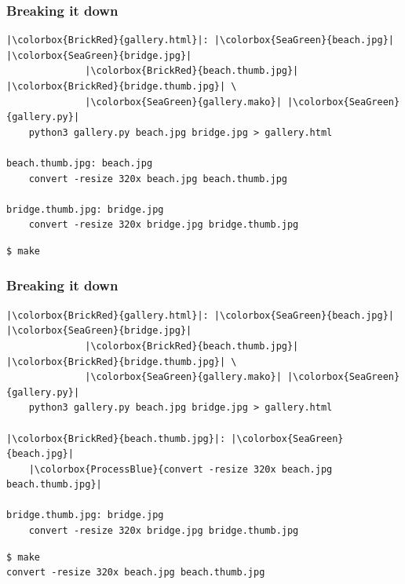 \documentclass[xcolor=dvipsnames,t,compress]{beamer}
\begin{document}
\begin{frame}[fragile]
\frametitle{Breaking it down}
\vspace{-1em}
\begin{verbatim}
|\colorbox{BrickRed}{gallery.html}|: |\colorbox{SeaGreen}{beach.jpg}| |\colorbox{SeaGreen}{bridge.jpg}|
              |\colorbox{BrickRed}{beach.thumb.jpg}| |\colorbox{BrickRed}{bridge.thumb.jpg}| \
			  |\colorbox{SeaGreen}{gallery.mako}| |\colorbox{SeaGreen}{gallery.py}|
	python3 gallery.py beach.jpg bridge.jpg > gallery.html

beach.thumb.jpg: beach.jpg
	convert -resize 320x beach.jpg beach.thumb.jpg

bridge.thumb.jpg: bridge.jpg
	convert -resize 320x bridge.jpg bridge.thumb.jpg
\end{verbatim}
\begin{verbatim}
$ make
\end{verbatim}
\end{frame}

\begin{frame}[fragile]
\frametitle{Breaking it down}
\vspace{-1em}
\begin{verbatim}
|\colorbox{BrickRed}{gallery.html}|: |\colorbox{SeaGreen}{beach.jpg}| |\colorbox{SeaGreen}{bridge.jpg}|
              |\colorbox{BrickRed}{beach.thumb.jpg}| |\colorbox{BrickRed}{bridge.thumb.jpg}| \
			  |\colorbox{SeaGreen}{gallery.mako}| |\colorbox{SeaGreen}{gallery.py}|
	python3 gallery.py beach.jpg bridge.jpg > gallery.html

|\colorbox{BrickRed}{beach.thumb.jpg}|: |\colorbox{SeaGreen}{beach.jpg}|
	|\colorbox{ProcessBlue}{convert -resize 320x beach.jpg beach.thumb.jpg}|

bridge.thumb.jpg: bridge.jpg
	convert -resize 320x bridge.jpg bridge.thumb.jpg
\end{verbatim}
\begin{verbatim}
$ make
convert -resize 320x beach.jpg beach.thumb.jpg
\end{verbatim}
\end{frame}
\end{document}

